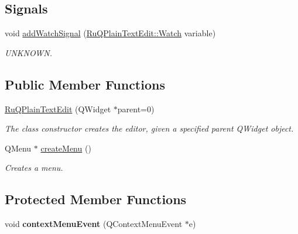 \subsection*{Signals}
\begin{DoxyCompactItemize}
\item 
\hypertarget{class_ru_q_plain_text_edit_a91e38e4be24851ce670ecf4d22965f1b}{}void \hyperlink{class_ru_q_plain_text_edit_a91e38e4be24851ce670ecf4d22965f1b}{add\+Watch\+Signal} (\hyperlink{struct_ru_q_plain_text_edit_1_1_watch}{Ru\+Q\+Plain\+Text\+Edit\+::\+Watch} variable)\label{class_ru_q_plain_text_edit_a91e38e4be24851ce670ecf4d22965f1b}

\begin{DoxyCompactList}\small\item\em U\+N\+K\+N\+O\+W\+N. \end{DoxyCompactList}\end{DoxyCompactItemize}
\subsection*{Public Member Functions}
\begin{DoxyCompactItemize}
\item 
\hypertarget{class_ru_q_plain_text_edit_a793cf95c0462ad8ae738c975d5f548ef}{}\hyperlink{class_ru_q_plain_text_edit_a793cf95c0462ad8ae738c975d5f548ef}{Ru\+Q\+Plain\+Text\+Edit} (Q\+Widget $\ast$parent=0)\label{class_ru_q_plain_text_edit_a793cf95c0462ad8ae738c975d5f548ef}

\begin{DoxyCompactList}\small\item\em The class constructor creates the editor, given a specified parent Q\+Widget object. \end{DoxyCompactList}\item 
Q\+Menu $\ast$ \hyperlink{class_ru_q_plain_text_edit_aad91c0ff3e7c3dede14ee0f6eb05afee}{create\+Menu} ()
\begin{DoxyCompactList}\small\item\em Creates a menu. \end{DoxyCompactList}\end{DoxyCompactItemize}
\subsection*{Protected Member Functions}
\begin{DoxyCompactItemize}
\item 
\hypertarget{class_ru_q_plain_text_edit_a3ebf1e882b641ceebd106c7fa44d0a2f}{}void {\bfseries context\+Menu\+Event} (Q\+Context\+Menu\+Event $\ast$e)\label{class_ru_q_plain_text_edit_a3ebf1e882b641ceebd106c7fa44d0a2f}

\end{DoxyCompactItemize}
